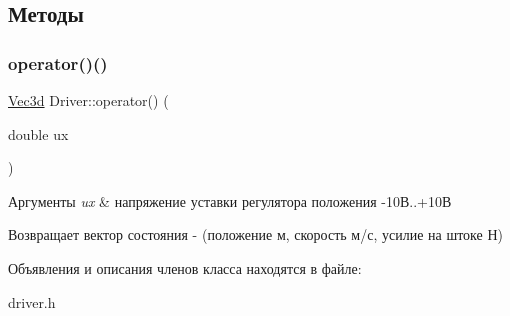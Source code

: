\subsection{Методы}
\mbox{\label{classDriver_a15e3c21483960b7a7af260273e95f294}} 
\subsubsection{\texorpdfstring{operator()()}{operator()()}}
{\footnotesize\ttfamily \hyperlink{structVec3}{Vec3d} Driver\+::operator() (\begin{DoxyParamCaption}\item[{double}]{ux }\end{DoxyParamCaption})\hspace{0.3cm}{\ttfamily [inline]}}


\begin{DoxyParams}{Аргументы}
{\em ux} & напряжение уставки регулятора положения -\/10В..+10В \\
\hline
\end{DoxyParams}
\begin{DoxyReturn}{Возвращает}
вектор состояния -\/ (положение м, скорость м/с, усилие на штоке Н) 
\end{DoxyReturn}


Объявления и описания членов класса находятся в файле\+:\begin{DoxyCompactItemize}
\item 
driver.\+h\end{DoxyCompactItemize}
